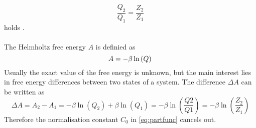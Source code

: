 \begin{equation}
\frac{Q_2}{Q_1} = \frac{Z_2}{Z_1}
\end{equation}
holds \autocite[17]{freeEnergyBook}.\\
\\
The Helmholtz free energy $A$ is definied as
\begin{equation}
	A = - \beta \ln\left(Q\right)\\
\end{equation}
Usually the exact value of the free energy is unknown, but the main interest lies in free energy differences between two states of a system. The difference $\Delta A$ can be written as
\begin{equation}
\Delta A = A_2 - A_1 = - \beta \ln\left(Q_2\right) + \beta \ln\left(Q_1\right) = -\beta \ln\left(\frac{Q2}{Q1}\right) = -\beta \ln \left(\frac{Z_2}{Z_1}\right)
\end{equation}
Therefore the normalisation constant $C_0$ in \autoref{eq:partfunc} cancels out.
